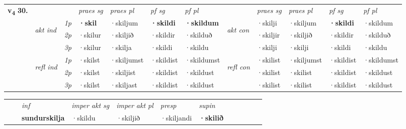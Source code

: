 \begin{tabular}{llllllllllll} \toprule
\multirow{4}{*}{{{\textbf{v{\textsubscript{4}}} \Large{\textbf{30.}}}}}  & &   &  \textit{praes sg}  & \textit{praes pl}  &\textit{ pf sg} & \textit{pf pl} &  &  \textit{praes sg}  & \textit{praes pl}  & \textit{pf sg} & \textit{pf pl } \\*
	\cmidrule{4-7} \cmidrule{9-12}
 & \multirow{3}{*}{\begin{turn}{90}\textit{akt ind}\end{turn}} & {\textit{1p}} & \textbf{·skil} & ·skiljum    & \textbf{·skildi} & \textbf{·skildum} & \multirow{3}{*}{\begin{turn}{90}\textit{akt con}\end{turn}} &·skilji & ·skiljum & \textbf{·skildi} & ·skildum\\*
& &  {\textit{2p}} &  ·skilur  & ·skiljið   & ·skildir & ·skilduð & & ·skiljir & ·skiljið & ·skildir & ·skilduð \\*
& &  {\textit{3p}} & ·skilur & ·skilja   & ·skildi & ·skildu & & ·skilji & ·skilji& ·skildi & ·skildu  \\*
\cmidrule{4-7} \cmidrule{9-12}
 &\multirow{3}{*}{\begin{turn}{90}\textit{refl ind}\end{turn}} & {\textit{1p}} & ·skilst & ·skiljumst    & ·skildist & ·skildumst & \multirow{3}{*}{\begin{turn}{90}\textit{refl con}\end{turn}}  &·skilist & ·skiljumst & ·skildist & ·skildumst\\*
 &&  {\textit{2p}} &  ·skilst  & ·skiljist   & ·skildist & ·skildust & &·skilist & ·skilist & ·skildist & ·skildust \\*
& &  {\textit{3p}} & ·skilst & ·skiljast   & ·skildist & ·skildust & & ·skilist & ·skilist& ·skildist & ·skildust  \\*
\cmidrule{4-7} \cmidrule{9-12}
\end{tabular}


\begin{tabular}{llllllllllll}
 & & \textit{inf} & \textit{imper akt sg} & \textit{imper akt pl}   & \textit{presp} & \textit{supin}       \\*
  & & \textbf{sundurskilja} & ·skildu  & ·skiljið   & ·skiljandi &  \textbf{·skilið}   \\*
\cmidrule{1-12}
\end{tabular}



